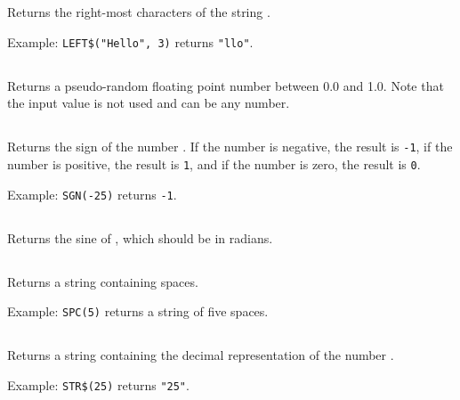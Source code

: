\documentclass{report}
\begin{document}
    Returns the right-most  characters of the string .

    Example: \verb+LEFT$("Hello", 3)+ returns \verb+"llo"+.

    \subsection*{}

    Returns a pseudo-random floating point number between 0.0 and 1.0.
    Note that the input value is not used and can be any number.
    
    \subsection*{}

    Returns the sign of the number .
    If the number is negative, the result is \verb+-1+,
    if the number is positive, the result is \verb+1+,
    and if the number is zero, the result is \verb+0+.

    Example: \verb+SGN(-25)+ returns \verb+-1+.

    \subsection*{}

    Returns the sine of , which should be in radians.

    \subsection*{}

    Returns a string containing  spaces.
    
    Example: \verb+SPC(5)+ returns a string of five spaces.

    \subsection*{}

    Returns a string containing the decimal representation of the number .
    
    Example: \verb+STR$(25)+ returns \verb+"25"+.

    \subsection*{}
\end{document}
